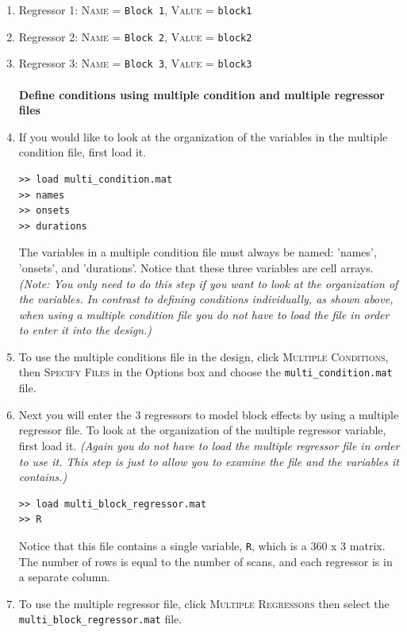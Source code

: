 \begin{enumerate}
\item Regressor 1: \textsc{Name} = \texttt{Block 1}, \textsc{Value} = \texttt{block1}
\item Regressor 2: \textsc{Name} = \texttt{Block 2}, \textsc{Value} = \texttt{block2}
\item Regressor 3: \textsc{Name} = \texttt{Block 3}, \textsc{Value} = \texttt{block3}\\\\

\textbf{Define conditions using multiple condition and multiple regressor files}
\item If you would like to look at the organization of the variables in the multiple condition file, first load it.
\begin{verbatim}
>> load multi_condition.mat
>> names
>> onsets
>> durations
\end{verbatim}
The variables in a multiple condition file must always be named: 'names', 'onsets', and 'durations'. Notice that these three variables are cell arrays.
\textit{(Note: You only need to do this step if you want to look at the organization of the variables. In contrast to defining conditions individually, as shown above, when using a multiple condition file you do not have to load the file in order to enter it into the design.)}\\
\item To use the multiple conditions file in the design, click \textsc{Multiple Conditions}, then \textsc{Specify Files} in the Options box and choose the \texttt{multi\_condition.mat} file.
\item Next you will enter the 3 regressors to model block effects by using a multiple regressor file. To look at the organization of the multiple regressor variable, first load it. \textit{(Again you do not have to load the multiple regressor file in order to use it. This step is just to allow you to examine the file and the variables it contains.)}
\begin{verbatim}
>> load multi_block_regressor.mat
>> R
\end{verbatim}
Notice that this file contains a single variable, \texttt{R}, which is a 360 x 3 matrix. The number of rows is equal to the number of scans, and each regressor is in a separate column.
\item To use the multiple regressor file, click \textsc{Multiple Regressors} then select the  \texttt{multi\_\-block\_\-regressor.mat} file.\\\\


\end{enumerate}
